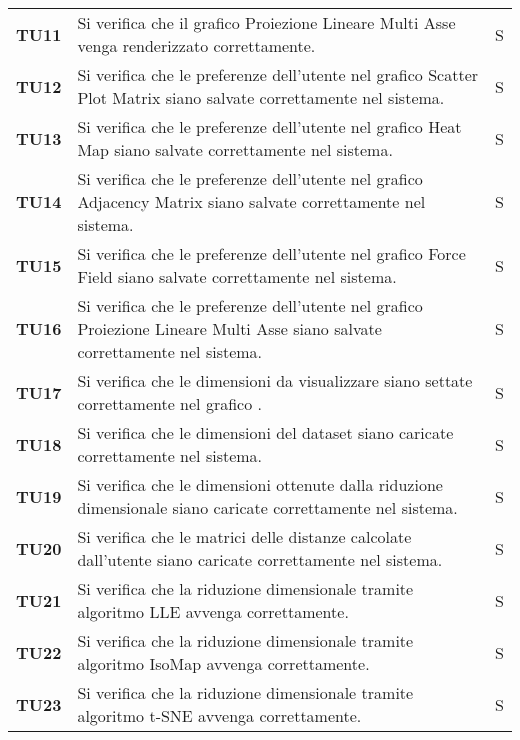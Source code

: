 {\begin{longtable}{ C{1.5cm} | C{12cm}| C{1.5cm} }
\textbf{TU11} & 
Si verifica che il grafico Proiezione Lineare Multi Asse venga renderizzato correttamente. & 
S\\

\textbf{TU12} & 
Si verifica che le preferenze dell'utente nel grafico Scatter Plot Matrix siano salvate correttamente nel sistema. & 
S\\

\textbf{TU13} & 
Si verifica che le preferenze dell'utente nel grafico Heat Map siano salvate correttamente nel sistema. & 
S\\

\textbf{TU14} & 
Si verifica che le preferenze dell'utente nel grafico Adjacency Matrix siano salvate correttamente nel sistema. & 
S\\

\textbf{TU15} & 
Si verifica che le preferenze dell'utente nel grafico Force Field siano salvate correttamente nel sistema. & 
S\\

\textbf{TU16} & 
Si verifica che le preferenze dell'utente nel grafico Proiezione Lineare Multi Asse siano salvate correttamente nel sistema. & 
S\\

\textbf{TU17} & 
Si verifica che le dimensioni da visualizzare siano settate correttamente nel grafico . & 
S\\

\textbf{TU18} & 
Si verifica che le dimensioni del dataset siano caricate correttamente nel sistema. & 
S\\

\textbf{TU19} & 
Si verifica che le dimensioni ottenute dalla riduzione dimensionale siano caricate correttamente nel sistema. & 
S\\

\textbf{TU20} & 
Si verifica che le matrici delle distanze calcolate dall'utente siano caricate correttamente nel sistema. & 
S\\

\textbf{TU21} & 
Si verifica che la riduzione dimensionale tramite algoritmo LLE avvenga correttamente. & 
S\\

\textbf{TU22} & 
Si verifica che la riduzione dimensionale tramite algoritmo IsoMap avvenga correttamente. & 
S\\

\textbf{TU23} & 
Si verifica che la riduzione dimensionale tramite algoritmo t-SNE avvenga correttamente. & 
S\\


\end{longtable}}

